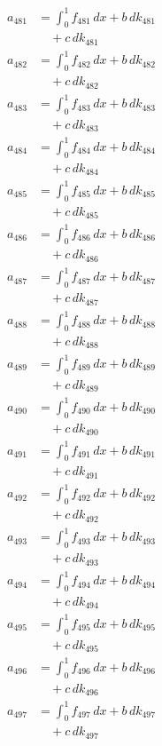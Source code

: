\documentclass{article}
\begin{document}
\begin{align}
a_{481} &= \int_0^1 f_{481}\,dx + b\,dk_{481} \\
&\quad + c\,dk_{481} \\
a_{482} &= \int_0^1 f_{482}\,dx + b\,dk_{482} \\
&\quad + c\,dk_{482} \\
a_{483} &= \int_0^1 f_{483}\,dx + b\,dk_{483} \\
&\quad + c\,dk_{483} \\
a_{484} &= \int_0^1 f_{484}\,dx + b\,dk_{484} \\
&\quad + c\,dk_{484} \\
a_{485} &= \int_0^1 f_{485}\,dx + b\,dk_{485} \\
&\quad + c\,dk_{485} \\
a_{486} &= \int_0^1 f_{486}\,dx + b\,dk_{486} \\
&\quad + c\,dk_{486} \\
a_{487} &= \int_0^1 f_{487}\,dx + b\,dk_{487} \\
&\quad + c\,dk_{487} \\
a_{488} &= \int_0^1 f_{488}\,dx + b\,dk_{488} \\
&\quad + c\,dk_{488} \\
a_{489} &= \int_0^1 f_{489}\,dx + b\,dk_{489} \\
&\quad + c\,dk_{489} \\
a_{490} &= \int_0^1 f_{490}\,dx + b\,dk_{490} \\
&\quad + c\,dk_{490} \\
a_{491} &= \int_0^1 f_{491}\,dx + b\,dk_{491} \\
&\quad + c\,dk_{491} \\
a_{492} &= \int_0^1 f_{492}\,dx + b\,dk_{492} \\
&\quad + c\,dk_{492} \\
a_{493} &= \int_0^1 f_{493}\,dx + b\,dk_{493} \\
&\quad + c\,dk_{493} \\
a_{494} &= \int_0^1 f_{494}\,dx + b\,dk_{494} \\
&\quad + c\,dk_{494} \\
a_{495} &= \int_0^1 f_{495}\,dx + b\,dk_{495} \\
&\quad + c\,dk_{495} \\
a_{496} &= \int_0^1 f_{496}\,dx + b\,dk_{496} \\
&\quad + c\,dk_{496} \\
a_{497} &= \int_0^1 f_{497}\,dx + b\,dk_{497} \\
&\quad + c\,dk_{497} \\

\end{align}
\end{document}
